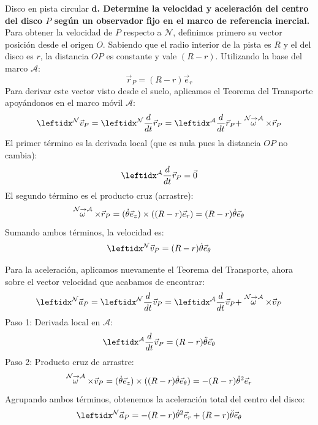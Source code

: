 \begin{solucion}{Disco en pista circular}
\textbf{d. Determine la velocidad y aceleración del centro del disco $P$ según un observador fijo en el marco de referencia inercial.}\\
Para obtener la velocidad de $P$ respecto a $\mathcal{N}$, definimos primero su vector posición desde el origen $O$. Sabiendo que el radio interior de la pista es $R$ y el del disco es $r$, la distancia $OP$ es constante y vale $(R-r)$. Utilizando la base del marco $\mathcal{A}$:
$$\vec{r}_P = (R-r)\vec{e}_r$$
Para derivar este vector visto desde el suelo, aplicamos el Teorema del Transporte apoyándonos en el marco móvil $\mathcal{A}$:
$$\marc{\vec{v}_P}{N} = \der{\vec{r}_P}{N} = \transporta{\vec{r}_P}{N}{A}$$
El primer término es la derivada local (que es nula pues la distancia $OP$ no cambia):
$$\der{\vec{r}_P}{A} = \vec{0}$$
El segundo término es el producto cruz (arrastre):
$$\stackrel{\mathcal{N} \to \mathcal{A}}{\omega} \times \vec{r}_P = (\dot\theta\vec{e}_z) \times ((R-r)\vec{e}_r) = (R-r)\dot\theta\vec{e}_\theta$$
Sumando ambos términos, la velocidad es:
$$\marc{\vec{v}_P}{N} = (R-r)\dot\theta\vec{e}_\theta$$

Para la aceleración, aplicamos nuevamente el Teorema del Transporte, ahora sobre el vector velocidad que acabamos de encontrar:
$$\marc{\vec{a}_P}{N} = \der{\vec{v}_P}{N} = \transporta{\vec{v}_P}{N}{A}$$
Paso 1: Derivada local en $\mathcal{A}$:
$$\der{\vec{v}_P}{A} = (R-r)\ddot\theta\vec{e}_\theta$$
Paso 2: Producto cruz de arrastre:
$$\stackrel{\mathcal{N} \to \mathcal{A}}{\omega} \times \vec{v}_P = (\dot\theta\vec{e}_z) \times ((R-r)\dot\theta\vec{e}_\theta) = -(R-r)\dot\theta^2\vec{e}_r$$
Agrupando ambos términos, obtenemos la aceleración total del centro del disco:
$$\marc{\vec{a}_P}{N} = -(R-r)\dot\theta^2\vec{e}_r + (R-r)\ddot\theta\vec{e}_\theta$$
\end{solucion}
